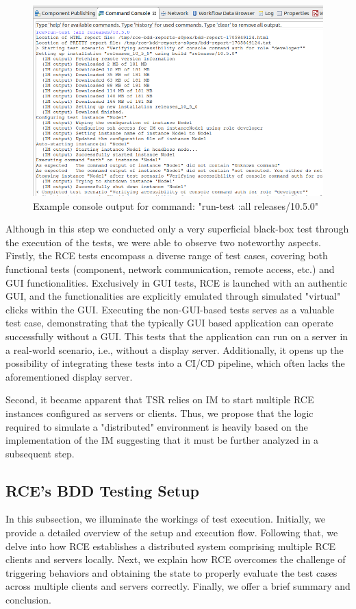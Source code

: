 \begin{figure}
    \centering
    \includegraphics[width=\linewidth]{files/figures/rce-execute-tests.png}
    \caption{Example console output for command: "run-test :all releases/10.5.0"}
    \label{fig:rce-test-output}
\end{figure}


Although in this step we conducted only a very superficial black-box test through the execution of the tests, we were able to observe two noteworthy aspects. Firstly, the \ac{RCE} tests encompass a diverse range of test cases, covering both functional tests (component, network communication, remote access, etc.) and \ac{GUI} functionalities. Exclusively in \ac{GUI} tests, \ac{RCE} is launched with an authentic \ac{GUI}, and the functionalities are explicitly emulated through simulated "virtual" clicks within the \ac{GUI}.
Executing the non-\acs{GUI}-based tests serves as a valuable test case, demonstrating that the typically \acs{GUI} based application can operate successfully without a \acs{GUI}. This tests that the application can run on a server in a real-world scenario, i.e., without a display server. Additionally, it opens up the possibility of integrating these tests into a CI/CD pipeline, which often lacks the aforementioned display server.

Second, it became apparent that \ac{TSR} relies on \ac{IM} to start multiple \ac{RCE} instances configured as servers or clients. Thus, we propose that the logic required to simulate a "distributed" environment is heavily based on the implementation of the \ac{IM} suggesting that it must be further analyzed in a subsequent step.

\subsection{\ac{RCE}'s BDD Testing Setup}
\label{subsec:BuiltinBDDTest}
In this subsection, we illuminate the workings of test execution. Initially, we provide a detailed overview of the setup and execution flow. Following that, we delve into how \ac{RCE} establishes a distributed system comprising multiple \ac{RCE} clients and servers locally. Next, we explain how \ac{RCE} overcomes the challenge of triggering behaviors and obtaining the state to properly evaluate the test cases across multiple clients and servers correctly. Finally, we offer a brief summary and conclusion.

